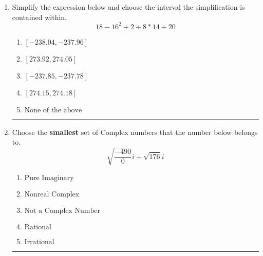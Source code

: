 \documentclass[14pt]{extbook}
\newcommand{\litem}[1]{\item#1\hspace*{-1cm}\rule{\textwidth}{0.4pt}}
\begin{document}
\begin{enumerate}
{\begin{enumerate}[label=\Alph*.]
\end{enumerate} }
\litem{
Simplify the expression below and choose the interval the simplification is contained within.\[ 18 - 16^2 + 2 \div 8 * 14 \div 20 \]\begin{enumerate}[label=\Alph*.]
\item \( [-238.04, -237.96] \)
\item \( [273.92, 274.05] \)
\item \( [-237.85, -237.78] \)
\item \( [274.15, 274.18] \)
\item \( \text{None of the above} \)

\end{enumerate} }
\litem{
Choose the \textbf{smallest} set of Complex numbers that the number below belongs to.\[ \sqrt{\frac{-490}{0}} i+\sqrt{176}i \]\begin{enumerate}[label=\Alph*.]
\item \( \text{Pure Imaginary} \)
\item \( \text{Nonreal Complex} \)
\item \( \text{Not a Complex Number} \)
\item \( \text{Rational} \)
\item \( \text{Irrational} \)

\end{enumerate} }
\end{enumerate}
\end{document}
